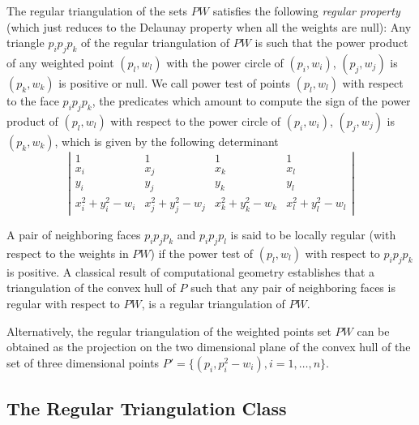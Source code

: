 The regular triangulation of the sets ${  PW}$
satisfies the following {\em regular property} (which just reduces to the 
Delaunay property when all the weights are null):
Any triangle $p_ip_jp_k$ of the regular triangulation
of ${  PW}$ is such that the power product of any weighted point
 $(p_l, w_l)$ with the power circle of
 $(p_i, w_i)$, $(p_j, w_j)$ is $(p_k, w_k)$ is positive or null.
We call  power test of points $(p_l, w_l)$ with respect
to the face  $p_ip_jp_k$, the predicates which amount to compute
the sign of 
the power product of $(p_l, w_l)$ with respect to
the power circle of
 $(p_i, w_i)$, $(p_j, w_j)$ is $(p_k, w_k)$,
which is given by the following
determinant
\[\left| \begin{array}{cccc}
1    & 1                       & 1                       & 1 \\
x_i & x_j & x_k & x_l \\
y_i & y_j & y_k & y_l \\
x_i ^2 + y_i ^2 -w_i & x_j ^2 + y_j ^2 - w_j & x_k ^2 + y_k ^2 - w_k &
x_l ^2 + y_l ^2 -w_l  
\end{array}
\right|
\]

A pair of neighboring faces $p_ip_jp_k$
and $p_ip_jp_l$ is said to be locally regular
(with respect to  the weights in ${  PW}$)
if the power test of $(p_l,w_l)$ with respect to
$p_ip_jp_k$ is positive.
A classical  result of computational geometry
establishes that a triangulation of the convex hull of ${  P}$
such that any pair of neighboring faces is regular with respect
to ${  PW}$, is a
 regular triangulation of ${  PW}$.

Alternatively, the regular triangulation
of the weighted points set ${  PW}$
can be obtained as the projection
on the two dimensional plane of the convex hull of the set of three
dimensional points 
${  P'}= \{ (p_i,p_i ^2 - w_i ), i = 1, \ldots , n \}$.

\subsection{ The Regular Triangulation  Class}


